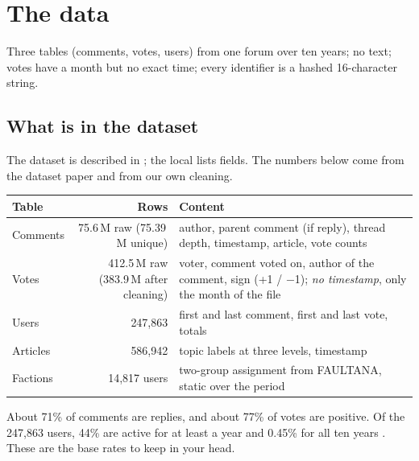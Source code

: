 \chapter{The data}\label{ch:data}

\begin{idea}
Three tables (comments, votes, users) from one forum over ten years; no text; votes have a month but no exact time; every identifier is a hashed 16-character string.
\end{idea}

\section{What is in the dataset}
The dataset is described in ; the local  lists fields. The numbers below come from the dataset paper and from our own cleaning.

\begin{tabularx}{\textwidth}{@{}l r Y@{}}
\toprule
Table & Rows & Content \\
\midrule
Comments & 75.6\,M raw (75.39\,M unique) & author, parent comment (if reply), thread depth, timestamp, article, vote counts \\
Votes & 412.5\,M raw (383.9\,M after cleaning) & voter, comment voted on, author of the comment, sign (+1 / $-$1); \emph{no timestamp}, only the month of the file \\
Users & 247,863 & first and last comment, first and last vote, totals \\
Articles & 586,942 & topic labels at three levels, timestamp \\
Factions & 14,817 users & two-group assignment from FAULTANA, static over the period \\
\bottomrule
\end{tabularx}

About 71\% of comments are replies, and about 77\% of votes are positive. Of the 247,863 users, 44\% are active for at least a year and 0.45\% for all ten years . These are the base rates to keep in your head.

